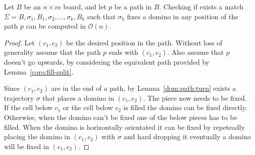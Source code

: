 \begin{lemma0}
 Let $B$ be an $n\times m $ board, and let $p$ be a path in $B$. Checking if exists a match $\Sigma = B,\sigma_1, B_1, \sigma_2, \dots, \sigma_k, B_k$ such that $\sigma_k$ fixes a domino in any position of the path $p$ can be computed in $\mathcal{O}(n)$.  
\end{lemma0}
\begin{proof} 
  Let $(c_1, c_2)$ be the desired position in the path. Without loss of generality assume that the path $p$ ends with $(c_1, c_2)$.  Also assume that $p$ doesn't go upwards, by considering the equivalent path provided by Lemma~\ref{coro:fill-split}.

  Since $(c_1, c_2)$ are in the end of a path, by Lemma~\ref{dom:path:turn} exists a trajectory $\sigma$ that places a domino in $(c_1, c_2)$. The piece now needs to be fixed. If the cell below $c_1$ or the cell below $c_2$ is filled the domino can be fixed directly. Otherwise, when the domino can't be fixed one of the below pieces has to be filled. When the domino is horizontally orientated it can be fixed by repeteadly placing the domino in $(c_1, c_2)$ with $\sigma$ and hard dropping it eventually a domino will be fixed in $(c_1, c_2)$.


\end{proof}
